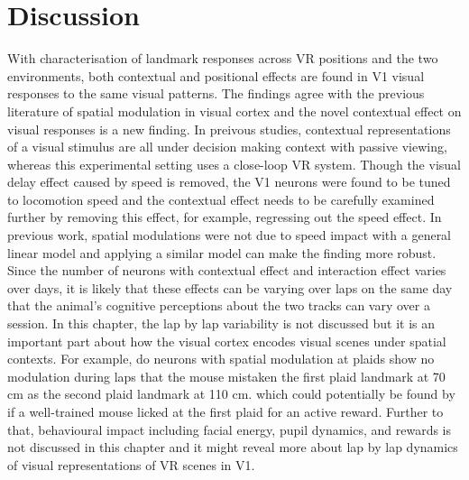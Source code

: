 




\section{Discussion}
With characterisation of landmark responses across VR positions and the two environments, both contextual and positional effects are found in V1 visual responses to the same visual patterns. The findings agree with the previous literature of spatial modulation in visual cortex and the novel contextual effect on visual responses is a new finding. In preivous studies, contextual representations of a visual stimulus are all under decision making context with passive viewing, whereas this experimental setting uses a close-loop VR system. Though the visual delay effect caused by speed is removed, the V1 neurons were found to be tuned to locomotion speed and the contextual effect needs to be carefully examined further by removing this effect, for example, regressing out the speed effect. In previous work, spatial modulations were not due to speed impact with a general linear model and applying a similar model can make the finding more robust. Since the number of neurons with contextual effect and interaction effect varies over days, it is likely that these effects can be varying over laps on the same day that the animal's cognitive perceptions about the two tracks can vary over a session. In this chapter, the lap by lap variability is not discussed but it is an important part about how the visual cortex encodes visual scenes under spatial contexts. For example, do neurons with spatial modulation at plaids show no modulation during laps that the mouse mistaken the first plaid landmark at 70 cm as the second plaid landmark at 110 cm. which could potentially be found by if a well-trained mouse licked at the first plaid for an active reward. Further to that, behavioural impact including facial energy, pupil dynamics, and rewards is not discussed in this chapter and it might reveal more about lap by lap dynamics of visual representations of VR scenes in V1.